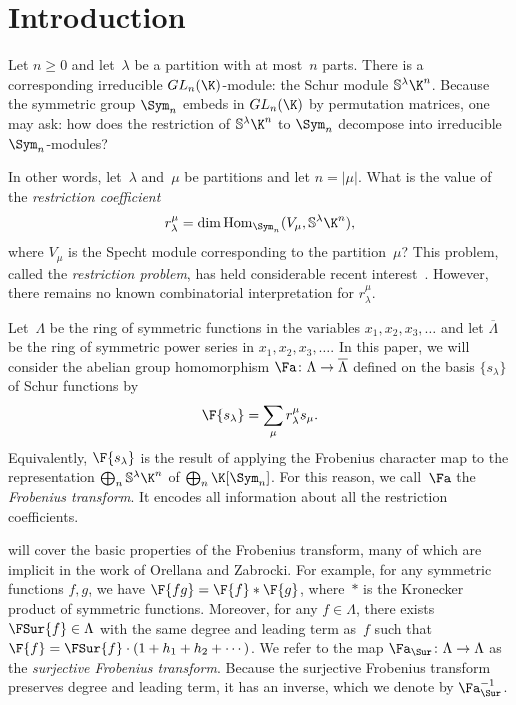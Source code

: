 \section{Introduction}
Let $n \geq 0$ and let~$\lambda$ be a partition with at most~$n$ parts. There is a corresponding irreducible $GL_n(\K)$-module: the Schur module $\mathbb{S}^\lambda \K^n$. Because the symmetric group $\Sym_n$ embeds in $GL_n(\K)$ by permutation matrices, one may ask: how does the restriction of $\mathbb{S}^\lambda \K^n$ to $\Sym_n$ decompose into irreducible $\Sym_n$-modules?

In other words, let~$\lambda$ and~$\mu$ be partitions and let $n = |\mu|$. What is the value of the \textit{restriction coefficient} \[r_{\lambda}^\mu = \dim \operatorname{Hom}_{\Sym_n}(V_\mu, \mathbb{S}^\lambda \K^n),\] where $V_\mu$ is the Specht module corresponding to the partition~$\mu$? This problem, called the \emph{restriction problem}, has held considerable recent interest~\cite{MR4055931, MR4356269, MR4311085, MR4295089, MR4127906}. However, there remains no known combinatorial interpretation for $r_\lambda^\mu$.

Let~$\Lambda$ be the ring of symmetric functions in the variables $x_1, x_2, x_3, \ldots$ and let $\overline{\Lambda}$ be the ring of symmetric power series in $x_1, x_2, x_3, \ldots$. In this paper, we will consider the abelian group homomorphism $\Fa \colon \Lambda \to \overline{\Lambda}$ defined on the basis $\{s_\lambda\}$ of Schur functions by \[\F{s_\lambda} = \sum_{\mu} r_{\lambda}^\mu s_\mu.\] Equivalently, $\F{s_\lambda}$ is the result of applying the Frobenius character map to the representation $\bigoplus_{n} \mathbb{S}^\lambda \K^n$ of $\bigoplus_{n} \K[\Sym_n]$. For this reason, we call~$\Fa$ the \emph{Frobenius transform}. It encodes all information about all the restriction coefficients.

 will cover the basic properties of the Frobenius transform, many of which are implicit in the work of Orellana and Zabrocki. For example, for any symmetric functions $f, g$, we have $\F{fg} = \F{f} \ast \F{g}$, where~$\ast$ is the Kronecker product of symmetric functions. Moreover, for any $f \in \Lambda$, there exists $\FSur{f} \in \Lambda$ with the same degree and leading term as~$f$ such that $\F{f} = \FSur{f} \cdot (1 + h_1 + h_2 + \cdots)$. We refer to the map $\Fa_{\Sur} \colon \Lambda \to \Lambda$ as the \emph{surjective Frobenius transform}. Because the surjective Frobenius transform preserves degree and leading term, it has an inverse, which we denote by $\Fa_{\Sur}^{-1}$.

